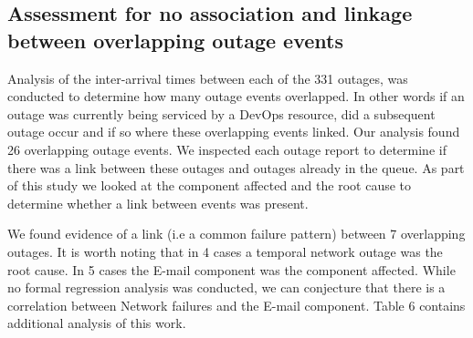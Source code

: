 \documentclass[5p]{elsarticle}
\begin{document}
\subsection{Assessment for no association and linkage between overlapping outage events}

Analysis of the inter-arrival times between each of the 331 outages, was conducted to determine how many outage events overlapped. In other words if an outage was currently being serviced by a DevOps resource, did a subsequent outage occur and if so where these overlapping events linked. Our analysis found 26 overlapping outage events. We inspected each outage report to determine if there was a link between these outages and outages already in the queue. As part of this study we looked at the component affected and the root cause to determine whether a link between events was present. 

We found evidence of a link (i.e a common failure pattern) between 7 overlapping outages. It is worth noting that in 4 cases a temporal network outage was the root cause. In 5 cases the E-mail component was the component affected. While no formal regression analysis was conducted, we can conjecture that there is a correlation between Network failures and the E-mail component. Table 6 contains additional analysis of this work.
\end{document}
